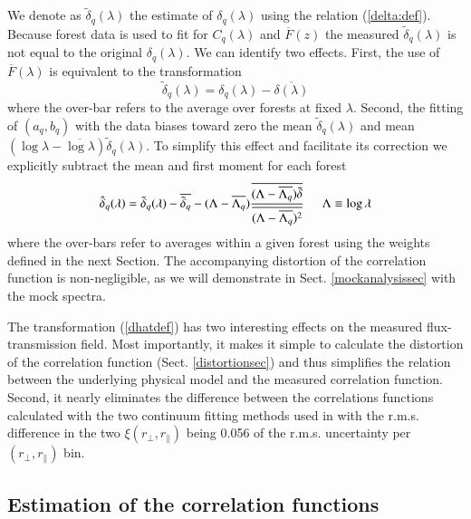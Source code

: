 \documentclass{aa}
\newcommand{\dqlam}{\delta_q(\lambda)}
\newcommand{\dhatqlam}{\hat\delta_q(\lambda)}
\newcommand{\dtildeqlam}{\tilde\delta_q(\lambda)}
\newcommand{\rperp}{r_\perp}
\newcommand{\rpar}{r_\parallel}
\begin{document}
We denote as $\dtildeqlam$ the estimate of $\dqlam$ using
the relation (\ref{delta:def}).
Because forest data is used to fit for $C_q(\lambda)$ and 
$\overline{F}(z)$
the measured $\dtildeqlam$ is not equal to the original $\dqlam$.
We can identify two effects.
First, the use of $\overline{F}(\lambda)$ is equivalent to the
transformation
\begin{equation}
\dtildeqlam = \dqlam
-\overline{\delta(\lambda)}
\label{dhatdef1}
\end{equation}
where the over-bar refers to the average over forests at fixed $\lambda$.
Second,
the fitting of $(a_q,b_q)$ with the data biases toward zero
the  mean $\dtildeqlam$
and mean $(\log\lambda-\overline{\log\lambda} )\dtildeqlam$.
To simplify this effect and facilitate its correction
we explicitly subtract
the mean and first moment for each forest
\begin{equation}
\dhatqlam = \dtildeqlam
- \overline{ \tilde\delta_q} 
- (\Lambda -\overline{\Lambda_q}) 
\frac{\overline{(\Lambda-\overline{\Lambda_q})\tilde\delta}}
{\overline{(\Lambda-\overline{\Lambda_q})^2}}
\hspace*{5mm}
\Lambda\equiv\log\lambda
\label{dhatdef}
\end{equation}
where the over-bars refer to averages within a given forest using
the weights defined in the next Section.
The accompanying distortion of the correlation function is non-negligible,
as we will demonstrate in Sect. \ref{mockanalysissec} with the mock spectra.

The transformation (\ref{dhatdef}) has two interesting
effects on the measured flux-transmission field.
Most importantly, it makes it simple to calculate the
distortion of the correlation function (Sect. \ref{distortionsec}) and
thus simplifies the relation between the underlying physical model
and the measured correlation function.
Second, it nearly eliminates the  difference between
the correlations functions calculated with the 
two continuum fitting methods used in \citet{2015A&A...574A..59D}
with the r.m.s. difference in the two $\xi(\rperp,\rpar)$
being 0.056 of the r.m.s. uncertainty per $(\rperp,\rpar)$ bin.




\subsection{Estimation of the correlation functions}
\label{xiestimationsec}
\end{document}
